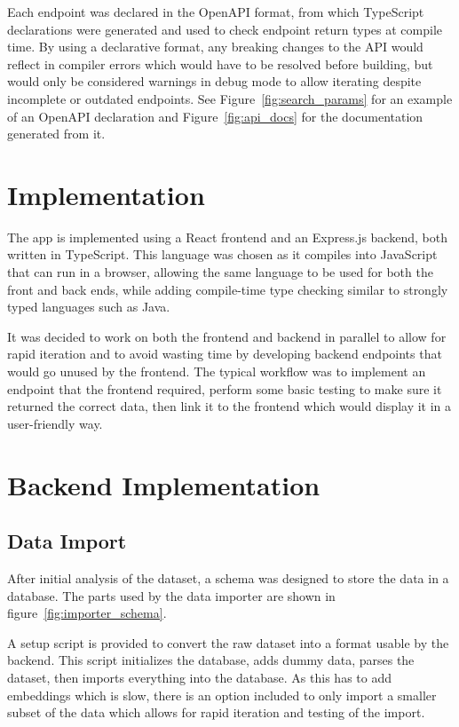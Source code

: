 Each endpoint was declared in the OpenAPI format, from which TypeScript declarations were generated and used to check endpoint return types at compile time.
By using a declarative format, any breaking changes to the API would reflect in compiler errors which would have to be resolved before building, but would
only be considered warnings in debug mode to allow iterating despite incomplete or outdated endpoints. See Figure~\ref{fig:search_params} for an example of
an OpenAPI declaration and Figure~\ref{fig:api_docs} for the documentation generated from it.

\section{Implementation}

The \chef{} app is implemented using a React frontend and an Express.js backend, both written in TypeScript.
This language was chosen as it compiles into JavaScript that can run in a browser, allowing the same language to be used for both
the front and back ends, while adding compile-time type checking similar to strongly typed languages such as Java.

It was decided to work on both the frontend and backend in parallel to allow for rapid iteration and to avoid wasting time by
developing backend endpoints that would go unused by the frontend. The typical workflow was to implement an endpoint that
the frontend required, perform some basic testing to make sure it returned the correct data, then link it to the frontend which
would display it in a user-friendly way.

\section{Backend Implementation}

\subsection{Data Import}

After initial analysis of the dataset, a schema was designed to store the data in a database. The parts used by the
data importer are shown in figure~\ref{fig:importer_schema}.

A setup script is provided to convert the raw dataset into a format usable by the backend.
This script initializes the database, adds dummy data, parses the dataset, then imports everything
into the database. As this has to add embeddings which is slow, there is an option included
to only import a smaller subset of the data which allows for rapid iteration and testing of the import.

